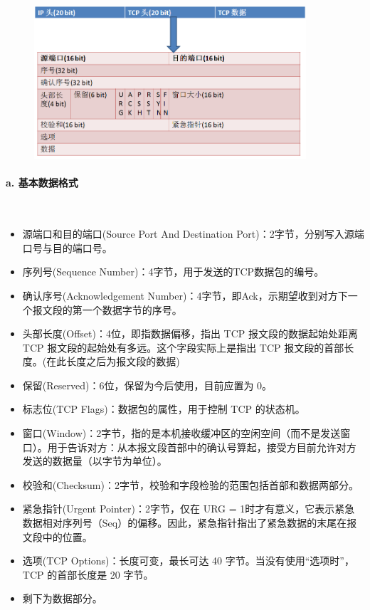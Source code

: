 \documentclass[UTF8]{article}%
\begin{document}
\begin{figure}[htb!]%
    \includegraphics[width=0.9\textwidth]{2.3-1.png}
    \label{fig::5}
\end{figure}

\paragraph{a. 基本数据格式}~{}

\begin{itemize}
    \item 源端口和目的端口(Source Port And Destination Port)：2字节，分别写入源端口号与目的端口号。
    \item 序列号(Sequence Number)：4字节，用于发送的TCP数据包的编号。
    \item 确认序号(Acknowledgement Number)：4字节，即Ack，示期望收到对方下一个报文段的第一个数据字节的序号。
    \item 头部长度(Offset)：4位，即指数据偏移，指出 TCP 报文段的数据起始处距离 TCP 报文段的起始处有多远。这个字段实际上是指出 TCP 报文段的首部长度。(在此长度之后为报文段的数据)
    \item 保留(Reserved)：6位，保留为今后使用，目前应置为 0。
    \item 标志位(TCP Flags)：数据包的属性，用于控制 TCP 的状态机。
    \item 窗口(Window)：2字节，指的是本机接收缓冲区的空闲空间（而不是发送窗口）。用于告诉对方：从本报文段首部中的确认号算起，接受方目前允许对方发送的数据量（以字节为单位）。
    \item 校验和(Checksum)：2字节，校验和字段检验的范围包括首部和数据两部分。
    \item 紧急指针(Urgent Pointer)：2字节，仅在 URG = 1时才有意义，它表示紧急数据相对序列号（Seq）的偏移。因此，紧急指针指出了紧急数据的末尾在报文段中的位置。
    \item 选项(TCP Options)：长度可变，最长可达 40 字节。当没有使用“选项时”，TCP 的首部长度是 20 字节。
    \item 剩下为数据部分。
\end{itemize}
\end{document}
